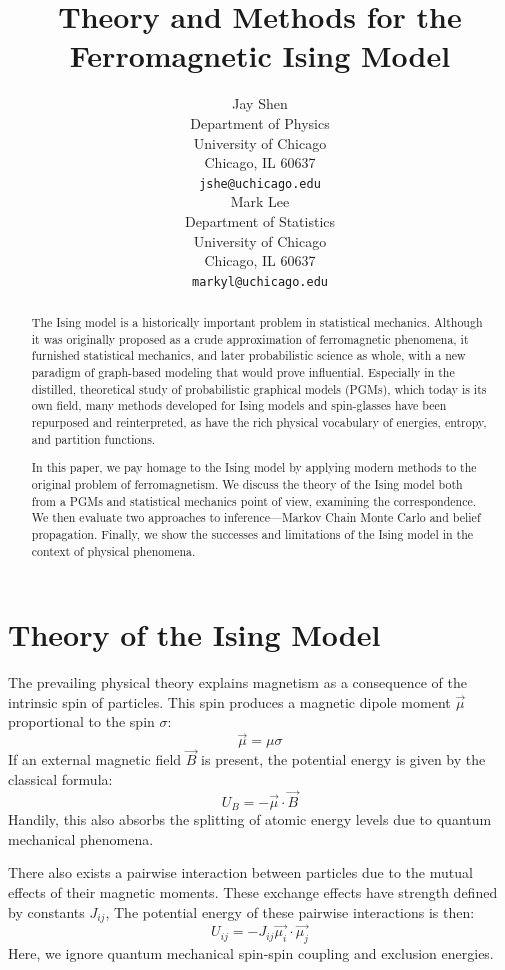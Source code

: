 \documentclass{article}
\title{Theory and Methods for the Ferromagnetic Ising Model}
\author{
    Jay Shen \\
    Department of Physics \\
    University of Chicago\\
    Chicago, IL 60637 \\
    \texttt{jshe@uchicago.edu} \\
    \And
    Mark Lee \\
    Department of Statistics \\
    University of Chicago\\
    Chicago, IL 60637 \\
    \texttt{markyl@uchicago.edu} \\
}
\begin{document}
\graphicspath{ {../graphics} }

\maketitle

\begin{abstract}

The Ising model is a historically important problem in statistical mechanics. 
Although it was originally proposed as a crude approximation of ferromagnetic 
phenomena, it furnished statistical mechanics, and later probabilistic science 
as whole, with a new paradigm of graph-based modeling that would prove 
influential.
Especially in the distilled, theoretical study of probabilistic graphical 
models (PGMs), which today is its own field, many methods developed for Ising models 
and spin-glasses have been repurposed and reinterpreted, as have the rich 
physical vocabulary of energies, entropy, and partition functions. 

In this paper, we pay homage to the Ising model by applying modern methods to 
the original problem of ferromagnetism. 
We discuss the theory of the Ising model both from a PGMs and statistical 
mechanics point of view, examining the correspondence. 
We then evaluate two approaches to inference—Markov Chain Monte Carlo and
belief propagation. 
Finally, we show the successes and limitations of the Ising model in the context 
of physical phenomena. 

\end{abstract}










\section{Theory of the Ising Model}

The prevailing physical theory explains magnetism as a consequence of the intrinsic 
spin of particles. 
This spin produces a magnetic dipole moment $\vec{\mu}$ proportional to the 
spin $\sigma$:
\[\vec{\mu} = \mu \sigma\]
If an external magnetic field $\vec{B}$ is present, the potential energy is 
given by the classical formula:
\[U_B = - \vec{\mu} \cdot \vec{B}\]
Handily, this also absorbs the splitting of atomic energy levels due to quantum 
mechanical phenomena. 

There also exists a pairwise interaction between particles due to the mutual 
effects of their magnetic moments.
These exchange effects have strength defined by constants $J_{ij}$, 
The potential energy of these pairwise interactions is then:
\[U_{ij} = - J_{ij} \vec{\mu_i} \cdot \vec{\mu_j}\]
Here, we ignore quantum mechanical spin-spin coupling and exclusion energies. 
\end{document}
